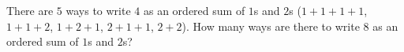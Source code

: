 There are $5$ ways to write $4$ as an ordered sum of $1$s and $2$s ($1+1+1+1$, $1+1+2$, $1+2+1$, $2+1+1$, $2+2$). How many ways are there to write $8$ as an ordered sum of $1$s and $2$s?

